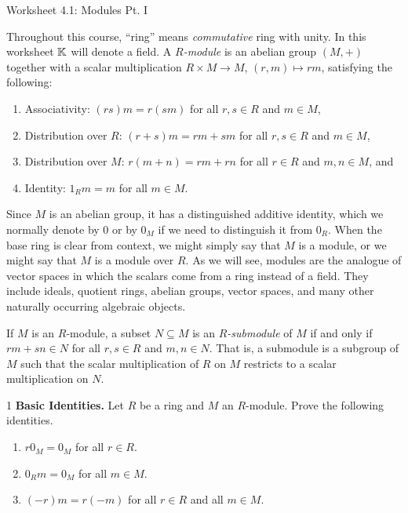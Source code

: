 \documentclass[Notebook.tex]{subfiles}
\begin{document}
\ifSubfilesClassLoaded{}{}

    \begin{center}  
        {Worksheet 4.1: Modules Pt. I}
    \end{center}

    Throughout this course, ``ring'' means \textit{commutative} ring with unity. In this worksheet $\mathbb K$ will denote a field. A \emph{$R$-module} is an abelian group $(M, +)$ together with a scalar multiplication $R\times M \to M$, $(r,m) \mapsto rm$, satisfying the following:
    \begin{enumerate}[label=(\roman*),ref=\theenumi\roman*]
        \item Associativity: $(rs)m = r(sm)$ for all $r,s \in R$ and $m \in M$,
        \item Distribution over $R$: $(r+s)m = rm + sm$ for all $r,s\in R$ and $m\in M$, 
        \item Distribution over $M$: $r(m+n) = rm+rn$ for all $r\in R$ and $m,n\in M$, and
        \item Identity: $1_{R}m = m$ for all $m\in M$. 
    \end{enumerate}
    Since $M$ is an abelian group, it has a distinguished additive identity, which we normally denote by $0$ or by $0_{M}$ if we need to distinguish it from $0_{R}$. When the base ring is clear from context, we might simply say that $M$ is a module, or we might say that $M$ is a module over $R$. As we will see, modules are the analogue of vector spaces in which the scalars come from a ring instead of a field. They include ideals, quotient rings, abelian groups, vector spaces, and many other naturally occurring algebraic objects.  

    If $M$ is an $R$-module, a subset $N \subseteq M$ is an \emph{$R$-submodule} of $M$ if and only if $rm+sn \in N$ for all $r,s\in R$ and $m,n\in N$. That is, a submodule is a subgroup of $M$ such that the scalar multiplication of $R$ on $M$ restricts to a scalar multiplication on $N$. 

    \hrulefill

    \newpage 

    \begin{problem}{1}
        \textbf{Basic Identities.} Let $R$ be a ring and $M$ an $R$-module. Prove the following identities.
        \begin{enumerate}
        \item $r0_{M} = 0_{M}$ for all $r \in R$.
        \item $0_{R}m = 0_{M}$ for all $m \in M$. 
        \item $(-r)m=r(-m)$ for all $r \in R$ and all $m\in M$. 
        \end{enumerate}
    \end{problem}
\end{document}
